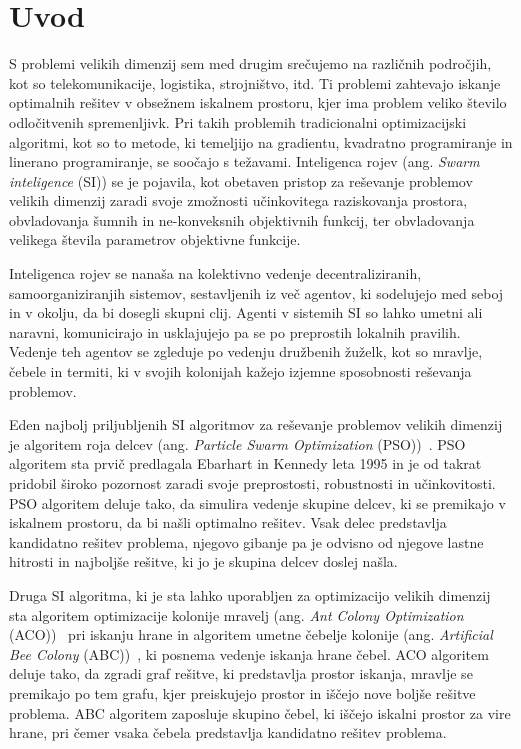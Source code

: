 \chapter{Uvod}\label{cahp:uvod}
S problemi velikih dimenzij sem med drugim srečujemo na različnih področjih, kot so telekomunikacije, logistika, strojništvo, itd.
Ti problemi zahtevajo iskanje optimalnih rešitev v obsežnem iskalnem prostoru, kjer ima problem veliko število odločitvenih spremenljivk.
Pri takih problemih tradicionalni optimizacijski algoritmi, kot so to metode, ki temeljijo na gradientu, kvadratno programiranje in linerano programiranje, se soočajo s težavami.
Inteligenca rojev (ang. \textit{Swarm inteligence} (SI)) se je pojavila, kot obetaven pristop za reševanje problemov velikih dimenzij zaradi svoje zmožnosti učinkovitega raziskovanja prostora, obvladovanja šumnih in ne-konveksnih objektivnih funkcij, ter obvladovanja velikega števila parametrov objektivne funkcije.

Inteligenca rojev se nanaša na kolektivno vedenje decentraliziranih, samoorganiziranjih sistemov, sestavljenih iz več agentov, ki sodelujejo med seboj in v okolju, da bi dosegli skupni clij.
Agenti v sistemih SI so lahko umetni ali naravni, komunicirajo in usklajujejo pa se po preprostih lokalnih pravilih.
Vedenje teh agentov se zgleduje po vedenju družbenih žuželk, kot so mravlje, čebele in termiti, ki v svojih kolonijah kažejo izjemne sposobnosti reševanja problemov.

Eden najbolj priljubljenih SI algoritmov za reševanje problemov velikih dimenzij je algoritem roja delcev (ang. \textit{Particle Swarm Optimization} (PSO))~\cite{alg:pso}.
PSO algoritem sta prvič predlagala Ebarhart in Kennedy leta 1995 in je od takrat pridobil široko pozornost zaradi svoje preprostosti, robustnosti in učinkovitosti.
PSO algoritem deluje tako, da simulira vedenje skupine delcev, ki se premikajo v iskalnem prostoru, da bi našli optimalno rešitev.
Vsak delec predstavlja kandidatno rešitev problema, njegovo gibanje pa je odvisno od njegove lastne hitrosti in najboljše rešitve, ki jo je skupina delcev doslej našla.

Druga SI algoritma, ki je sta lahko uporabljen za optimizacijo velikih dimenzij sta algoritem optimizacije kolonije mravelj (ang. \textit{Ant Colony Optimization} (ACO))~\cite{alg:aco} pri iskanju hrane in algoritem umetne čebelje kolonije (ang. \textit{Artificial Bee Colony} (ABC))~\cite{alg:abc}, ki posnema vedenje iskanja hrane čebel.
ACO algoritem deluje tako, da zgradi graf rešitve, ki predstavlja prostor iskanja, mravlje se premikajo po tem grafu, kjer preiskujejo prostor in iščejo nove boljše rešitve problema.
ABC algoritem zaposluje skupino čebel, ki iščejo iskalni prostor za vire hrane, pri čemer vsaka čebela predstavlja kandidatno rešitev problema.

